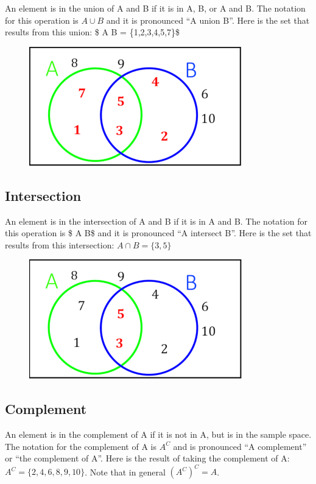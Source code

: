 \documentclass[]{book}
\begin{document}
An element is in the union of A and B if it is in A, B, or A and B. The
notation for this operation is \(A \cup B\) and it is pronounced ``A
union B''. Here is the set that results from this union: \$ A \cup B =
\{1,2,3,4,5,7\}\$

\begin{figure}
\centering
\includegraphics{Pictures/01-Sets/AUB.PNG}
\caption{}
\end{figure}

\subsection{Intersection}\label{intersection}

An element is in the intersection of A and B if it is in A and B. The
notation for this operation is \$ A \cap B\$ and it is pronounced ``A
intersect B''. Here is the set that results from this intersection:
\(A \cap B = \{3,5\}\)

\begin{figure}
\centering
\includegraphics{Pictures/01-Sets/AcapB.PNG}
\caption{}
\end{figure}

\subsection{Complement}\label{complement}

An element is in the complement of A if it is not in A, but is in the
sample space. The notation for the complement of A is \(A^C\) and is
pronounced ``A complement'' or ``the complement of A''. Here is the
result of taking the complement of A: \(A^C = \{2,4,6,8,9,10\}\). Note
that in general \((A^C)^C = A\).
\end{document}
